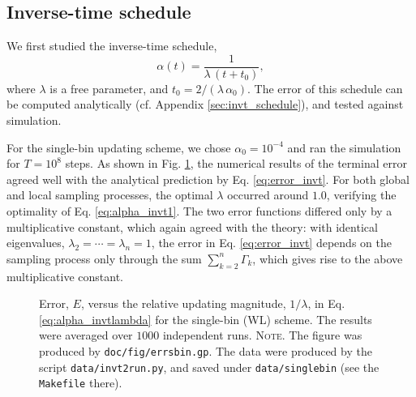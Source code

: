 \documentclass[reprint, floatfix]{revtex4-1}
\newcommand{\note}[1]{{\color{DarkGreen}\footnotesize \textsc{Note.} #1}}
\begin{document}
\subsection{\label{sec:results_invt}
Inverse-time schedule}


We first studied the inverse-time schedule,
%
\begin{equation}
\alpha(t) = \frac{1}{\lambda \, (t + t_0) },
\label{eq:alpha_invtlambda}
\end{equation}
%
where $\lambda$ is a free parameter,
and $t_0 = 2/(\lambda \, \alpha_0)$.
%
The error of this schedule
can be computed analytically
(cf. Appendix \ref{sec:invt_schedule}),
and tested against simulation.





For the single-bin updating scheme,
we chose $\alpha_0 = 10^{-4}$
and ran the simulation for $T = 10^8$ steps.
%
As shown in Fig. \ref{fig:errsbin},
the numerical results of the terminal error agreed well with
the analytical prediction by Eq. \eqref{eq:error_invt}.
%
For both global and local sampling processes,
the optimal $\lambda$ occurred around $1.0$,
verifying the optimality of Eq. \eqref{eq:alpha_invt1}.
%
%
The two error functions
differed only by a multiplicative constant,
which again agreed with the theory:
%
with identical eigenvalues,
$\lambda_2 = \cdots = \lambda_n = 1$,
the error in Eq. \eqref{eq:error_invt}
depends on the sampling process only through
the sum $\sum_{ k = 2 }^n \Gamma_k$,
which gives rise to the above multiplicative constant.


\begin{figure}[h]
\begin{center}
  \caption{
    \label{fig:errsbin}
    Error, $E$, versus the
    relative updating magnitude,
    $1/\lambda$,
    in Eq. \eqref{eq:alpha_invtlambda}
    for the single-bin (WL) scheme.
    The results were averaged over $1000$ independent runs.
    \note{The figure was produced by \texttt{doc/fig/errsbin.gp}.
      The data were produced by the script \texttt{data/invt2run.py},
      and saved under \texttt{data/singlebin}
      (see the \texttt{Makefile} there).
    }%
  }
\end{center}
\end{figure}
\end{document}
